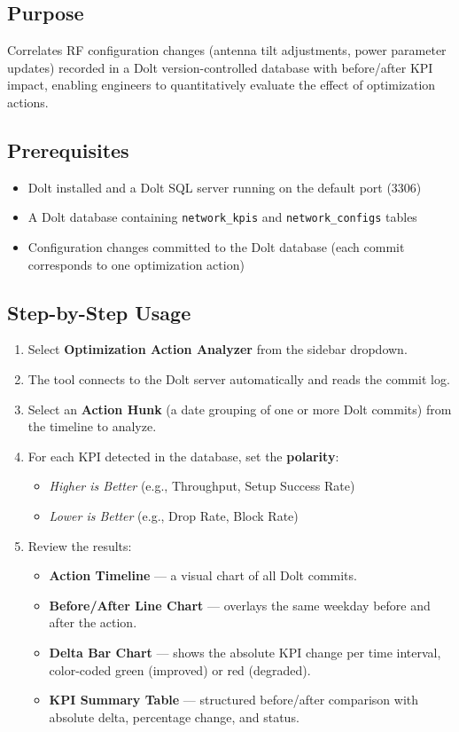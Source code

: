 \subsection{Purpose}

Correlates RF configuration changes (antenna tilt adjustments, power parameter updates) recorded in a Dolt version-controlled database with before/after KPI impact, enabling engineers to quantitatively evaluate the effect of optimization actions.

\subsection{Prerequisites}

\begin{itemize}
    \item Dolt installed and a Dolt SQL server running on the default port (3306)
    \item A Dolt database containing \texttt{network\_kpis} and \texttt{network\_configs} tables
    \item Configuration changes committed to the Dolt database (each commit corresponds to one optimization action)
\end{itemize}

\subsection{Step-by-Step Usage}

\begin{enumerate}
    \item Select \textbf{Optimization Action Analyzer} from the sidebar dropdown.
    \item The tool connects to the Dolt server automatically and reads the commit log.
    \item Select an \textbf{Action Hunk} (a date grouping of one or more Dolt commits) from the timeline to analyze.
    \item For each KPI detected in the database, set the \textbf{polarity}:
        \begin{itemize}
            \item \textit{Higher is Better} (e.g., Throughput, Setup Success Rate)
            \item \textit{Lower is Better} (e.g., Drop Rate, Block Rate)
        \end{itemize}
    \item Review the results:
        \begin{itemize}
            \item \textbf{Action Timeline} — a visual chart of all Dolt commits.
            \item \textbf{Before/After Line Chart} — overlays the same weekday before and after the action.
            \item \textbf{Delta Bar Chart} — shows the absolute KPI change per time interval, color-coded green (improved) or red (degraded).
            \item \textbf{KPI Summary Table} — structured before/after comparison with absolute delta, percentage change, and status.
        \end{itemize}
\end{enumerate}

